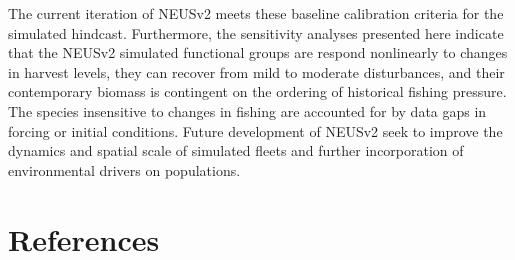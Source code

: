 \documentclass[
]{article}
\begin{document}
The current iteration of NEUSv2 meets these baseline calibration criteria for the simulated hindcast. Furthermore, the sensitivity analyses presented here indicate that the NEUSv2 simulated functional groups are respond nonlinearly to changes in harvest levels, they can recover from mild to moderate disturbances, and their contemporary biomass is contingent on the ordering of historical fishing pressure. The species insensitive to changes in fishing are accounted for by data gaps in forcing or initial conditions. Future development of NEUSv2 seek to improve the dynamics and spatial scale of simulated fleets and further incorporation of environmental drivers on populations.

\clearpage
\FloatBarrier

\section{References}\label{references}
\end{document}
